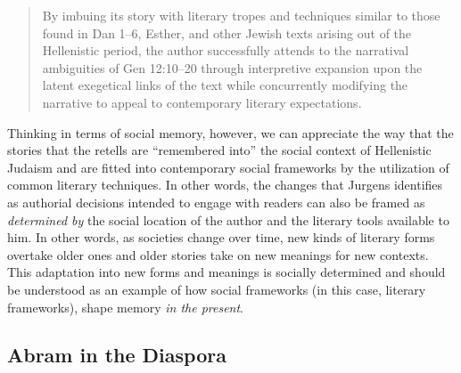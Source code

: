 \begin{quote}
By imbuing its story with literary tropes and techniques similar to those found in Dan 1--6, Esther, and other Jewish texts arising out of the Hellenistic period, the author successfully attends to the narratival ambiguities of Gen 12:10--20 through interpretive expansion upon the latent exegetical links of the text while concurrently modifying the narrative to appeal to contemporary literary expectations.\autocite[27]{jurgens_jsj2018} \end{quote}

Thinking in terms of social memory, however, we can appreciate the way that the stories that the \ga retells are ``remembered into'' the social context of Hellenistic Judaism and are fitted into contemporary social frameworks by the utilization of common literary techniques. In other words, the changes that Jurgens identifies as authorial decisions intended to engage with readers can also be framed as \emph{determined by} the social location of the author and the literary tools available to him. In other words, as societies change over time, new kinds of literary forms overtake older ones and older stories take on new meanings for new contexts. This adaptation into new forms and meanings is socially determined and should be understood as an example of how social frameworks (in this case, literary frameworks), shape memory \emph{in the present}.

\subsection{Abram in the Diaspora}

